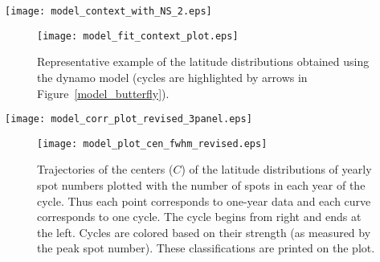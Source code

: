 \documentclass[preprint2,times,tighten]{aastex61}
\begin{document}
\begin{figure*}%
\centering
\texttt{[image: model\_context\_with\_NS\_2.eps]}

\caption{Butterfly diagram generated using a Babcock-Leighton type flux transport dynamo model. The inset box shows a zoomed in view of the diagram for better visualization. Two arrows highlight the cycles used for generating Figure~\ref{model_histo}.} 
\label{model_butterfly}
\end{figure*}
\begin{figure}%
\centering
\texttt{[image: model\_fit\_context\_plot.eps]}
\caption{Representative example of the latitude distributions obtained using the dynamo model (cycles are highlighted by arrows in Figure~\ref{model_butterfly}). } 
\label{model_histo}
\end{figure}
\begin{figure*}%
\centering
\texttt{[image: model\_corr\_plot\_revised\_3panel.eps]}
\caption{Scatter plots showing the correlations of $C_{\rm{ moment}}$, $\delta_{\rm{ moment}}$, and $H_{\rm{ moment}}$ 
with the peak spot numbers as obtained from the dynamo model. Top and bottom panels 
are obtained from the northern and southern hemispheres, respectively.} 
\label{model_corr}
\end{figure*}
\begin{figure}%
\centering
\texttt{[image: model\_plot\_cen\_fwhm\_revised.eps]}
\caption{Trajectories of the centers ($C$) of the latitude distributions of yearly spot numbers
plotted with the number of spots in each year of the cycle. 
Thus each point corresponds to one-year data and each curve corresponds to one cycle. 
The cycle begins from right and ends at the left.
Cycles are colored based on their strength (as measured by the peak spot number). These classifications are printed on the plot.} 
\label{model_cameron}
\end{figure}
\end{document}
